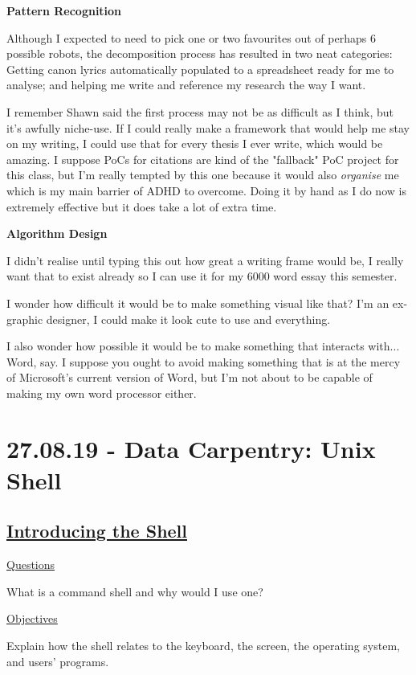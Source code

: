 \documentclass[12pt]{article}
\begin{document}
\textbf{Pattern Recognition}

Although I expected to need to pick one or two favourites out of perhaps 6 possible robots, the decomposition process has resulted in two neat categories: Getting canon lyrics automatically populated to a spreadsheet ready for me to analyse; and helping me write and reference my research the way I want.

I remember Shawn said the first process may not be as difficult as I think, but it's awfully niche-use. If I could really make a framework that would help me stay on my writing, I could use that for every thesis I ever write, which would be amazing. I suppose PoCs for citations are kind of the "fallback" PoC project for this class, but I'm really tempted by this one because it would also \textit{organise} me which is my main barrier of ADHD to overcome. Doing it by hand as I do now is extremely effective but it does take a lot of extra time.

\textbf{Algorithm Design}

I didn't realise until typing this out how great a writing frame would be, I really want that to exist already so I can use it for my 6000 word essay this semester. 

I wonder how difficult it would be to make something visual like that? I'm an ex-graphic designer, I could make it look cute to use and everything. 

I also wonder how possible it would be to make something that interacts with... Word, say. I suppose you ought to avoid making something that is at the mercy of Microsoft's current version of Word, but I'm not about to be capable of making my own word processor either.

\newpage
\section{27.08.19 - Data Carpentry: Unix Shell}

\subsection{\href{http://swcarpentry.github.io/shell-novice/01-intro/index.html}{Introducing the Shell}}

\color{gray}
\underline{Questions}

What is a command shell and why would I use one?

\underline{Objectives}

Explain how the shell relates to the keyboard, the screen, the operating system, and users’ programs.
\end{document}
